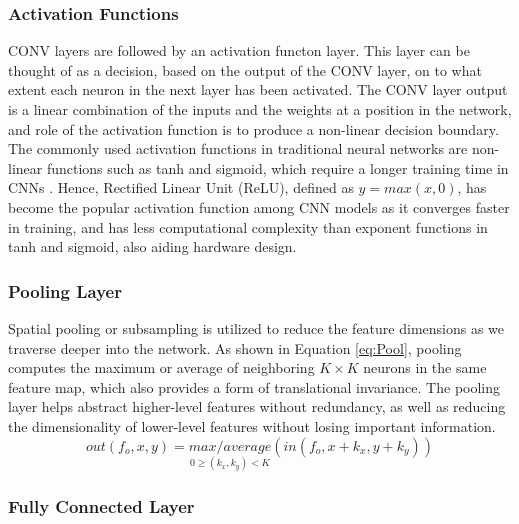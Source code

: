 \documentclass[12pt]{article}
\begin{document}
\subsubsection{Activation Functions}
\label{sec:Background-CNN-Activation}

CONV layers are followed by an activation functon layer. This layer can be thought of as a decision, based on the output of the CONV layer, on to what extent each neuron in the next layer has been activated. The CONV layer output is a linear combination of the inputs and the weights at a position in the network, and role of the activation function is to produce a non-linear decision boundary. The commonly used activation functions in traditional neural networks are non-linear functions such as tanh and sigmoid, which require a longer training time in CNNs \cite{AlexNet}. Hence, Rectified Linear Unit (ReLU), defined as $y = max(x,0)$, has become the popular activation function among CNN models as it converges faster in training, and has less computational complexity than exponent functions in tanh and sigmoid, also aiding hardware design.

\subsubsection{Pooling Layer}
\label{sec:Background-CNN-Pool}

Spatial pooling or subsampling is utilized to reduce the feature dimensions as we traverse deeper into the network. As shown in Equation \ref{eq:Pool}, pooling computes the maximum or average of neighboring $K\times K$ neurons in the same feature map, which also provides a form of translational invariance\cite{PoolAnalysis}. The pooling layer helps abstract higher-level features without redundancy, as well as reducing the dimensionality of lower-level features without losing important information\cite{fpgaCnnAccelerator}.
\begin{equation}
out(f_o,x,y)=\underset{0\geqslant (k_x,k_y)<K}{max/average}(in(f_o,x+k_x,y+k_y))
\label{eq:Pool}
\end{equation}

\subsubsection{Fully Connected Layer}
\label{sec:Background-CNN-FC}
\end{document}
